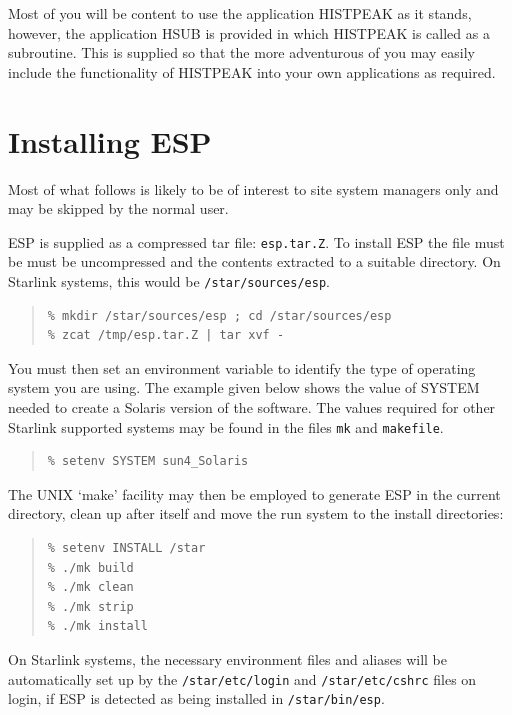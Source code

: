 \documentclass[twoside,11pt]{article}
\newenvironment{myquote}{\begin{quote}\begin{small}}{\end{small}\end{quote}}
\begin{document}
Most of you will be content to use the application HISTPEAK as it stands,
however, the application HSUB is provided in which HISTPEAK is called as
a subroutine. This is supplied so that the more adventurous of you may
easily include the functionality of HISTPEAK into your own
applications as required.


\section{Installing ESP}
\label{sec:installing}

Most of what follows is likely to be of interest to site system managers only 
and may be skipped by the normal user.

ESP is supplied as a compressed tar file: {\tt esp.tar.Z}. To install ESP 
the file must be must be uncompressed and the contents extracted to a
suitable directory.  On Starlink systems, this would be {\tt /star/sources/esp}.

\begin{myquote}
\begin{verbatim}
% mkdir /star/sources/esp ; cd /star/sources/esp
% zcat /tmp/esp.tar.Z | tar xvf -
\end{verbatim}
\end{myquote}

You must then set an environment variable to identify the type of
operating system you are using. The example given below shows the value
of SYSTEM needed to create a Solaris version of the software. The values
required for other Starlink supported systems may be found in the files
{\tt mk} and {\tt makefile}.

\begin{myquote}
\begin{verbatim}
% setenv SYSTEM sun4_Solaris
\end{verbatim}
\end{myquote}

The UNIX `make' facility may then be employed to generate ESP in the
current directory, clean up after itself and move the run system to the
install directories:

\begin{myquote}
\begin{verbatim}
% setenv INSTALL /star
% ./mk build
% ./mk clean
% ./mk strip
% ./mk install
\end{verbatim}
\end{myquote}

On Starlink systems, the necessary environment files and aliases will
be automatically set up by the {\tt /star/etc/login} and {\tt /star/etc/cshrc}
files on login, if ESP is detected as being installed in {\tt /star/bin/esp}.
\end{document}
